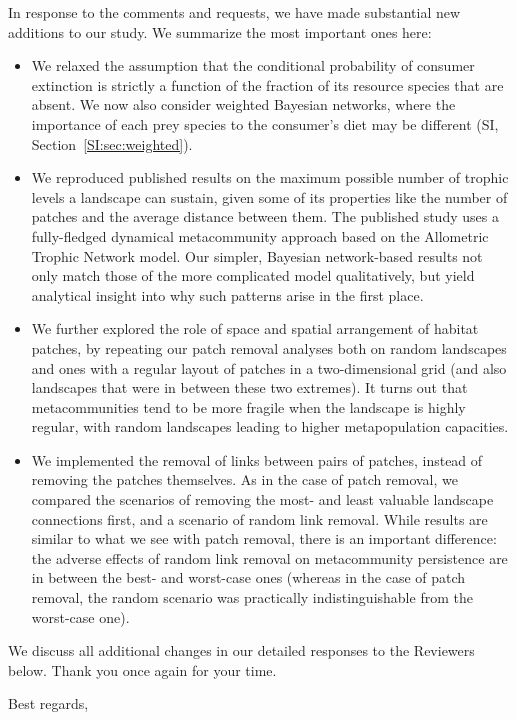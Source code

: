 \documentclass[11pt]{article}
\newcommand{\SI}{SI}
\begin{document}
In response to the comments and requests, we have made substantial new additions to our study. We summarize the most important ones here:
\begin{itemize}
\item We relaxed the assumption that the conditional probability of consumer extinction is strictly a function of the fraction of its resource species that are absent. We now also consider weighted Bayesian networks, where the importance of each prey species to the consumer's diet may be different (\SI, Section~\ref{SI:sec:weighted}).
\item We reproduced published results on the maximum possible number of trophic levels a landscape can sustain, given some of its properties like the number of patches and the average distance between them. The published study \citep{Ryser2019} uses a fully-fledged dynamical metacommunity approach based on the Allometric Trophic Network model. Our simpler, Bayesian network-based results not only match those of the more complicated model qualitatively, but yield analytical insight into why such patterns arise in the first place.
\item We further explored the role of space and spatial arrangement of habitat patches, by repeating our patch removal analyses both on random landscapes and ones with a regular layout of patches in a two-dimensional grid (and also landscapes that were in between these two extremes). It turns out that metacommunities tend to be more fragile when the landscape is highly regular, with random landscapes leading to higher metapopulation capacities.
\item We implemented the removal of links between pairs of patches, instead of removing the patches themselves. As in the case of patch removal, we compared the scenarios of removing the most- and least valuable landscape connections first, and a scenario of random link removal. While results are similar to what we see with patch removal, there is an important difference: the adverse effects of random link removal on metacommunity persistence are in between the best- and worst-case ones (whereas in the case of patch removal, the random scenario was practically indistinguishable from the worst-case one).
\end{itemize}


We discuss all additional changes in our detailed responses to the Reviewers below. Thank you once again for your time.

\bigskip

Best regards,
\end{document}
